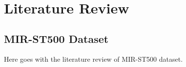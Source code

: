 \documentclass{article}
\begin{document}
\author{Yiwei Gong, A0228568N}

\makeatother

\section{Literature Review}

\subsection{MIR-ST500 Dataset}

Here goes with the literature review of MIR-ST500 dataset.
\end{document}
